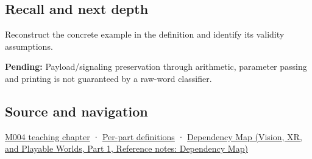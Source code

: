 \subsection{Recall and next depth}\label{appendix-d6607cc4c235-recall-and-next-depth}

\hypertarget{appendix-d6607cc4c235-recall-and-next-depth}{}

Reconstruct the concrete example in the definition and identify its validity assumptions.

\textbf{Pending:} Payload/signaling preservation through arithmetic, parameter passing and printing is not guaranteed by a raw-word classifier.

\subsection{Source and navigation}\label{appendix-d6607cc4c235-source-and-navigation}

\hypertarget{appendix-d6607cc4c235-source-and-navigation}{}

\hyperref[01-foundations-i-ch001-a-stretching-ruler-for-real-valued-quantities]{M004 teaching chapter} · \hyperref[appendix-fd090d982a15-m004---parts-61-76]{Per-part definitions} · \href{../07-Vision-XR-and-Playable-Worlds-P01/main.pdf\#nameddest=appendix-4ad47bdd269a}{Dependency Map (Vision, XR, and Playable Worlds, Part 1, Reference notes: Dependency Map)}
